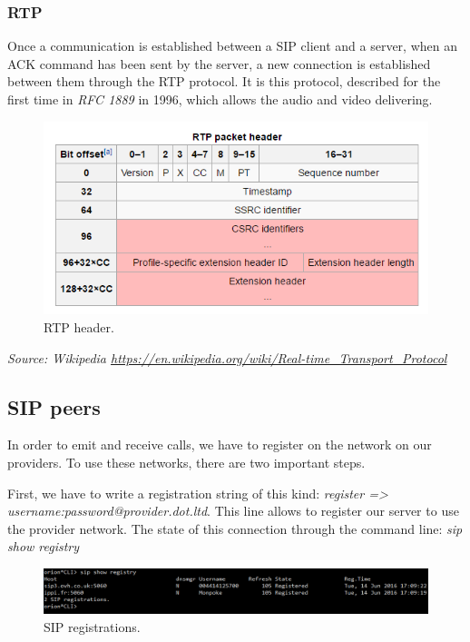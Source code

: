 \subsubsection{RTP}
Once a communication is established between a SIP client and a server, when an ACK command has been sent by the server, a new connection is established between them through the RTP protocol. It is this protocol, described for the first time in \textit{RFC 1889} in 1996, which allows the audio and video delivering. 

 
\begin{figure}[!ht]
  \caption{RTP header.}
  \centering
    \includegraphics[width=1\textwidth]{img/rtpheader.png}
\end{figure}
\textit{\small{Source: Wikipedia \url{https://en.wikipedia.org/wiki/Real-time_Transport_Protocol}}}


\subsection{SIP peers}
In order to emit and receive calls, we have to register on the network on our providers. To use these networks, there are two important steps. 


First, we have to write a registration string of this kind: \textit{register => username:password@provider.dot.ltd}. This line allows to register our server to use the provider network. The state of this connection through the command line: \textit{sip show registry}

\begin{figure}[!ht]
  \caption{SIP registrations.}
  \centering
    \includegraphics[width=1\textwidth]{img/sipshowregistry.png}
\end{figure}



